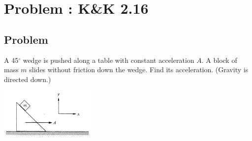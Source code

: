 \documentclass[solutions]{esg8012pset}
\begin{document}
\section{Problem \thesection: K\&K 2.16}
\subsection{Problem}
  A 45$^{\circ}$ wedge is pushed along a table with constant acceleration $A$. A block of mass $m$ slides without friction down the wedge. Find its acceleration. (Gravity is directed down.)
  \begin{center}\includegraphics[width=0.35\textwidth]{ps02_4}\end{center}
\end{document}
